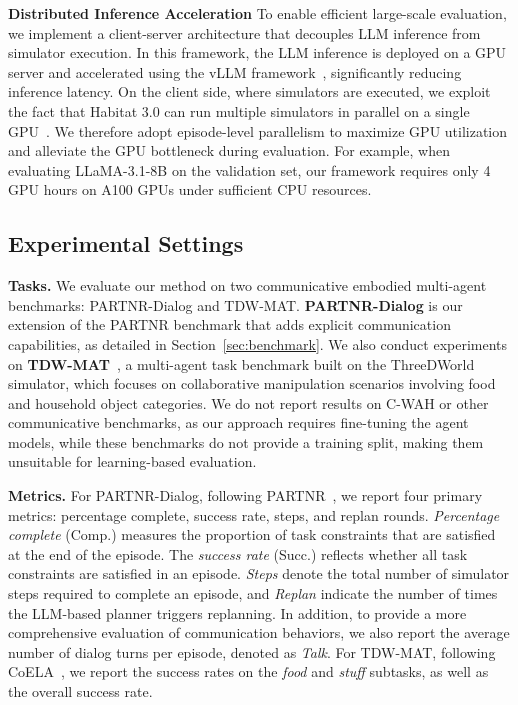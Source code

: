 \documentclass{article}
\theoremstyle{plain}
\theoremstyle{definition}
\theoremstyle{remark}
\newcommand{\AC}[1]{\textcolor{red}{~AC: {#1}}}
\begin{document}
\textbf{Distributed Inference Acceleration} To enable efficient large-scale evaluation, we implement a client-server architecture that decouples LLM inference from simulator execution. In this framework, the LLM inference is deployed on a GPU server and accelerated using the vLLM framework~\cite{vllm}, significantly reducing inference latency. On the client side, where simulators are executed, we exploit the fact that Habitat 3.0 can run multiple simulators in parallel on a single GPU~\cite{habitat3}. We therefore adopt episode-level parallelism to maximize GPU utilization and alleviate the GPU bottleneck during evaluation. For example, when evaluating LLaMA-3.1-8B on the validation set, our framework requires only 4 GPU hours on A100 GPUs under sufficient CPU resources.

\subsection{Experimental Settings}

\textbf{Tasks.}
We evaluate our method on two communicative embodied multi-agent benchmarks: PARTNR-Dialog and TDW-MAT.
\textbf{PARTNR-Dialog} is our extension of the PARTNR benchmark that adds explicit communication capabilities, as detailed in Section~\ref{sec:benchmark}.
We also conduct experiments on \textbf{TDW-MAT}~\cite{coela}, a multi-agent task benchmark built on the ThreeDWorld~\cite{tdw} simulator, which focuses on collaborative manipulation scenarios involving food and household object categories. We do not report results on C-WAH or other communicative benchmarks, as our approach requires fine-tuning the agent models, while these benchmarks do not provide a training split, making them unsuitable for learning-based evaluation.

\textbf{Metrics.}
For PARTNR-Dialog, following PARTNR~\cite{partnr}, we report four primary metrics: percentage complete, success rate, steps, and replan rounds. \textit{Percentage complete} (Comp.) measures the proportion of task constraints that are satisfied at the end of the episode. The \textit{success rate} (Succ.) reflects whether all task constraints are satisfied in an episode. \textit{Steps} denote the total number of simulator steps required to complete an episode, and \textit{Replan} indicate the number of times the LLM-based planner triggers replanning. %
In addition, to provide a more comprehensive evaluation of communication behaviors, we also report the average number of dialog turns per episode, denoted as \textit{Talk}. For TDW-MAT, following CoELA~\cite{coela}, we report the success rates on the \textit{food} and \textit{stuff} subtasks, as well as the overall success rate.
\end{document}
